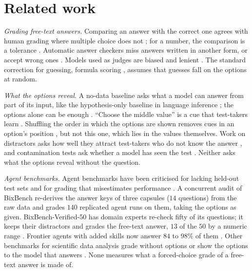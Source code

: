 \documentclass{article}
\begin{document}
\section{Related work}
\label{sec:related}

\emph{Grading free-text answers.} Comparing an answer with the correct one agrees with human grading where multiple
choice does not \citep{answermatching,openstyle}; for a number, the comparison is a tolerance \citep{scibench}.
Automatic answer checkers miss answers written in another form, or accept wrong ones
\citep{xverify,compassverifier,verifierpitfalls}. Models used as judges are biased and lenient
\citep{llmjudge,fairevaluators,judgingjudges}. The standard correction for guessing, formula scoring
\citep{lordformula,frary}, assumes that guesses fall on the options at random.

\emph{What the options reveal.} A no-data baseline asks what a model can answer from part of its input, like the
hypothesis-only baseline in language inference \citep{hypothesisonly,artifacts}; the options alone can be enough
\citep{choicesonly,shortcut,rightwrong,niven}. ``Choose the middle value'' is a cue that test-takers learn
\citep{testwiseness}. Shuffling the order in which the options are shown removes cues in an option's position
\citep{attalibarhillel,selectionbias,positionsensitivity}, but not this one, which lies in the values themselves.
Work on distractors asks how well they attract test-takers who do not know the answer
\citep{haladynataxonomy,haladynarodriguez,distractorgeneration,distractorfunction,howmanyoptions,threeoptions}, and
contamination tests ask whether a model has seen the test
\citep{memorisationexploitation,contaminationsurvey,taskcontamination,minkprob,memorisation,timetravel,tsguessing,exchangeablecontamination}.
Neither asks what the options reveal without the question.

\emph{Agent benchmarks.} Agent benchmarks have been criticised for lacking held-out test sets and for grading that
misestimates performance \citep{agentsmatter,abc}. A concurrent audit of BixBench \citep{bixbenchaudit} re-derives the
answer keys of three capsules ($14$ questions) from the raw data and grades $140$ replicated agent runs on them,
taking the options as given. BixBench-Verified-50 has domain experts re-check fifty of its questions; it keeps their
distractors and grades the free-text answer, $13$ of the $50$ by a numeric range \citep{verified50}. Frontier agents
with added skills now answer $84$ to $98\%$ of them \citep{zhang2026}. Other benchmarks for scientific data analysis
grade without options \citep{corebench,discoverybench,scienceagentbench} or show the options to the model that
answers \citep{labbench}. None measures what a forced-choice grade of a free-text answer is made of.
\end{document}
